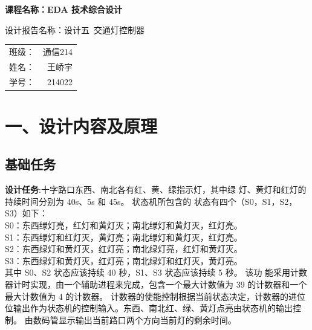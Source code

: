 \documentclass{article}
\newcommand{\fourhao}{\fontsize{14pt}{\baselineskip}\selectfont} %
\newcommand{\xiaosihao}{\fontsize{12pt}{\baselineskip}\selectfont} %
\begin{document}
\begin{titlepage}
    \centering
    \vspace*{2cm}

    \Huge
    \textbf{课程名称：EDA 技术综合设计}

    \vspace{2cm}

    \LARGE
    设计报告名称：设计五\ 交通灯控制器

    \vspace{4cm}

    \centering
    \Large
    \begin{tabular}{rl}
        班级： & 通信214    \\
        姓名： & \ 王峤宇    \\
        学号： & \ 214022
    \end{tabular}

    \vfill

    \vspace{1cm}
\end{titlepage}

\newpage
\section*{\fourhao 一、设计内容及原理}
\xiaosihao
{}
\subsection*{基础任务}
\textbf{设计任务}:十字路口东西、南北各有红、黄、绿指示灯，其中绿 灯、黄灯和红灯的持续时间分别为 40s、5s 和 45s。 状态机所包含的
状态有四个（S0，S1，S2，S3）如下：\\
S0：东西绿灯亮，红灯和黄灯灭；南北绿灯和黄灯灭，红灯亮。\\
S1：东西绿灯和红灯灭，黄灯亮；南北绿灯和黄灯灭，红灯亮。\\
S2：东西绿灯和黄灯灭，红灯亮；南北绿灯亮，红灯和黄灯灭。\\
S3：东西绿灯和黄灯灭，红灯亮；南北绿灯和红灯灭，黄灯亮。\\
其中 S0、S2 状态应该持续 40 秒，S1、S3 状态应该持续 5 秒。
该功 能采用计数器计时实现，由一个辅助进程来完成，包含一个最大计数值为 39 的计数器和一个最大计数值为 4 的计数器。
计数器的使能控制根据当前状态决定，计数器的进位位输出作为状态机的控制输入。东西、南北红、绿、黄灯点亮由状态机的输出控制。
由数码管显示输出当前路口两个方向当前灯的剩余时间。\\
\end{document}
